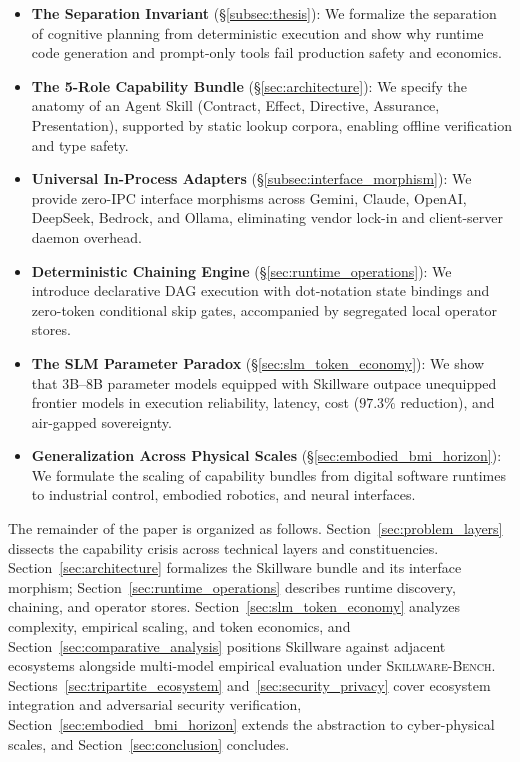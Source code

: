 \begin{tcolorbox}[contribbox]
\begin{itemize}[leftmargin=2.2em, itemsep=2.5pt, labelsep=0.5em]
  \item[\textbf{\textcolor{swBlue}{C1.}}] \textbf{The Separation Invariant} (\S\ref{subsec:thesis}): We formalize the separation of cognitive planning from deterministic execution and show why runtime code generation and prompt-only tools fail production safety and economics.
  \item[\textbf{\textcolor{swBlue}{C2.}}] \textbf{The 5-Role Capability Bundle} (\S\ref{sec:architecture}): We specify the anatomy of an Agent Skill (Contract, Effect, Directive, Assurance, Presentation), supported by static lookup corpora, enabling offline verification and type safety.
  \item[\textbf{\textcolor{swBlue}{C3.}}] \textbf{Universal In-Process Adapters} (\S\ref{subsec:interface_morphism}): We provide zero-IPC interface morphisms across Gemini, Claude, OpenAI, DeepSeek, Bedrock, and Ollama, eliminating vendor lock-in and client-server daemon overhead.
  \item[\textbf{\textcolor{swBlue}{C4.}}] \textbf{Deterministic Chaining Engine} (\S\ref{sec:runtime_operations}): We introduce declarative DAG execution with dot-notation state bindings and zero-token conditional skip gates, accompanied by segregated local operator stores.
  \item[\textbf{\textcolor{swBlue}{C5.}}] \textbf{The SLM Parameter Paradox} (\S\ref{sec:slm_token_economy}): We show that 3B--8B parameter models equipped with Skillware outpace unequipped frontier models in execution reliability, latency, cost ($97.3\%$ reduction), and air-gapped sovereignty.
  \item[\textbf{\textcolor{swBlue}{C6.}}] \textbf{Generalization Across Physical Scales} (\S\ref{sec:embodied_bmi_horizon}): We formulate the scaling of capability bundles from digital software runtimes to industrial control, embodied robotics, and neural interfaces.
\end{itemize}
\end{tcolorbox}

The remainder of the paper is organized as follows. Section~\ref{sec:problem_layers} dissects the capability crisis across technical layers and constituencies. Section~\ref{sec:architecture} formalizes the Skillware bundle and its interface morphism; Section~\ref{sec:runtime_operations} describes runtime discovery, chaining, and operator stores. Section~\ref{sec:slm_token_economy} analyzes complexity, empirical scaling, and token economics, and Section~\ref{sec:comparative_analysis} positions Skillware against adjacent ecosystems alongside multi-model empirical evaluation under \textsc{Skillware-Bench}. Sections~\ref{sec:tripartite_ecosystem} and~\ref{sec:security_privacy} cover ecosystem integration and adversarial security verification, Section~\ref{sec:embodied_bmi_horizon} extends the abstraction to cyber-physical scales, and Section~\ref{sec:conclusion} concludes.
